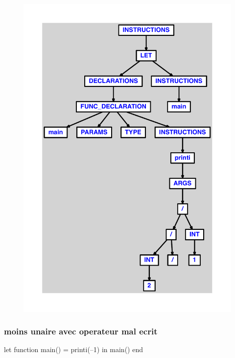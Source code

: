 \documentclass{article}
\begin{document}
\begin{figure}[H]\centering\includegraphics[max width=\textwidth]{ast/ast_25.pdf}\end{figure}\subsubsection{moins unaire avec operateur mal ecrit}
\begin{verbatimtab}
let
	function main() = printi(--1)
in main() end
\end{verbatimtab}
\end{document}
